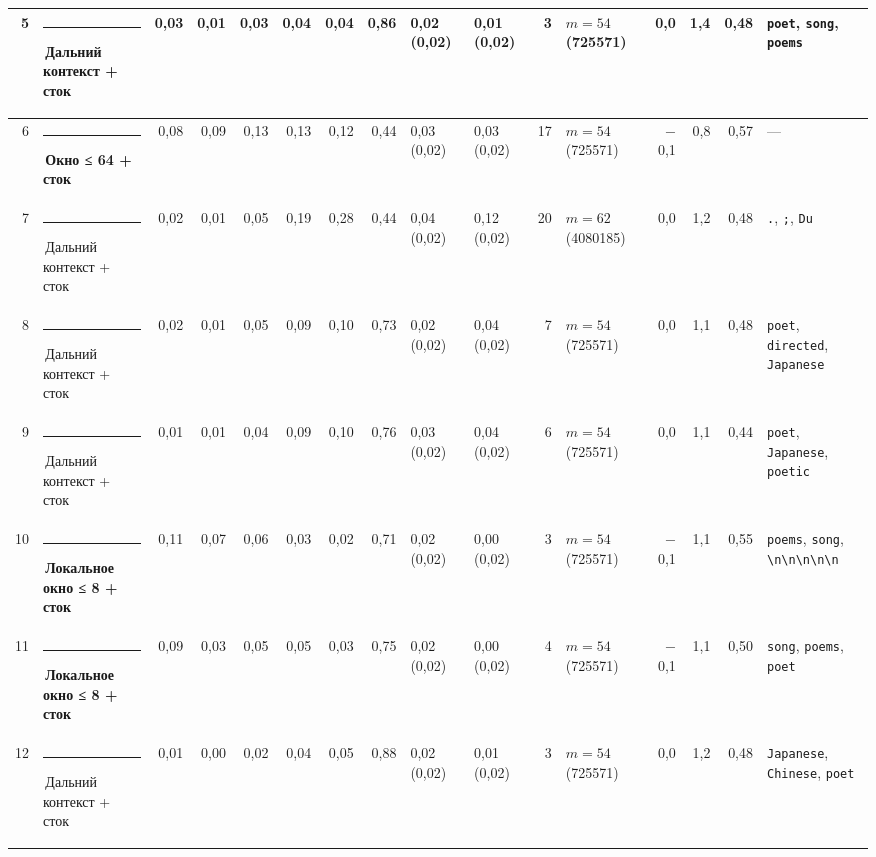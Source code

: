 \documentclass[10pt]{article}
\begin{document}
\begin{minipage}{\linewidth}
\begin{center}
{\begin{tabular}{|r|l|r|r|r|r|r|r|l|l|r|l|r|r|r|l|}
5 & \textcolor[HTML]{C3C2B7}{\rule{0.62em}{0.62em}}\,Дальний контекст + сток & 0,03 & 0,01 & 0,03 & 0,04 & 0,04 & 0,86 & 0,02 (0,02) & 0,01 (0,02) & 3 & $m{=}54$ (725571) & 0,0 & 1,4 & 0,48 & \texttt{\textvisiblespace{}poet}, \texttt{\textvisiblespace{}song}, \texttt{\textvisiblespace{}poems} \\ \hline
6 & \textcolor[HTML]{EDA100}{\rule{0.62em}{0.62em}}\,\textbf{Окно ≤ 64 + сток} & 0,08 & 0,09 & 0,13 & 0,13 & 0,12 & 0,44 & 0,03 (0,02) & 0,03 (0,02) & 17 & $m{=}54$ (725571) & $-$0,1 & 0,8 & 0,57 & — \\ \hline
7 & \textcolor[HTML]{C3C2B7}{\rule{0.62em}{0.62em}}\,Дальний контекст + сток & 0,02 & 0,01 & 0,05 & 0,19 & 0,28 & 0,44 & 0,04 (0,02) & 0,12 (0,02) & 20 & $m{=}62$ (4080185) & 0,0 & 1,2 & 0,48 & \texttt{\textvisiblespace{}.}, \texttt{\textvisiblespace{};}, \texttt{\textvisiblespace{}Du} \\ \hline
8 & \textcolor[HTML]{C3C2B7}{\rule{0.62em}{0.62em}}\,Дальний контекст + сток & 0,02 & 0,01 & 0,05 & 0,09 & 0,10 & 0,73 & 0,02 (0,02) & 0,04 (0,02) & 7 & $m{=}54$ (725571) & 0,0 & 1,1 & 0,48 & \texttt{\textvisiblespace{}poet}, \texttt{\textvisiblespace{}directed}, \texttt{\textvisiblespace{}Japanese} \\ \hline
9 & \textcolor[HTML]{C3C2B7}{\rule{0.62em}{0.62em}}\,Дальний контекст + сток & 0,01 & 0,01 & 0,04 & 0,09 & 0,10 & 0,76 & 0,03 (0,02) & 0,04 (0,02) & 6 & $m{=}54$ (725571) & 0,0 & 1,1 & 0,44 & \texttt{\textvisiblespace{}poet}, \texttt{\textvisiblespace{}Japanese}, \texttt{\textvisiblespace{}poetic} \\ \hline
10 & \textcolor[HTML]{1BAF7A}{\rule{0.62em}{0.62em}}\,\textbf{Локальное окно ≤ 8 + сток} & 0,11 & 0,07 & 0,06 & 0,03 & 0,02 & 0,71 & 0,02 (0,02) & 0,00 (0,02) & 3 & $m{=}54$ (725571) & $-$0,1 & 1,1 & 0,55 & \texttt{\textvisiblespace{}poems}, \texttt{\textvisiblespace{}song}, \texttt{\textvisiblespace{}\textbackslash{}n\textbackslash{}n\textbackslash{}n\textbackslash{}n\textbackslash{}n} \\ \hline
11 & \textcolor[HTML]{1BAF7A}{\rule{0.62em}{0.62em}}\,\textbf{Локальное окно ≤ 8 + сток} & 0,09 & 0,03 & 0,05 & 0,05 & 0,03 & 0,75 & 0,02 (0,02) & 0,00 (0,02) & 4 & $m{=}54$ (725571) & $-$0,1 & 1,1 & 0,50 & \texttt{\textvisiblespace{}song}, \texttt{\textvisiblespace{}poems}, \texttt{\textvisiblespace{}poet} \\ \hline
12 & \textcolor[HTML]{C3C2B7}{\rule{0.62em}{0.62em}}\,Дальний контекст + сток & 0,01 & 0,00 & 0,02 & 0,04 & 0,05 & 0,88 & 0,02 (0,02) & 0,01 (0,02) & 3 & $m{=}54$ (725571) & 0,0 & 1,2 & 0,48 & \texttt{\textvisiblespace{}Japanese}, \texttt{\textvisiblespace{}Chinese}, \texttt{\textvisiblespace{}poet} \\ \hline

\end{tabular}}
\end{center}
\end{minipage}
\end{document}
